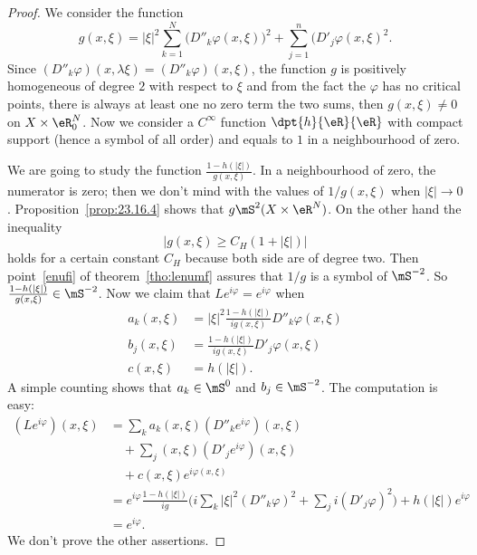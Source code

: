 \begin{proof}
	We consider the function
	\[
		g(x,\xi)=| \xi |^2\sum_{k=1}^N\big( D''_k\varphi(x,\xi) \big)^2+\sum_{j=1}^n\big( D'_j\varphi(x,\xi)^2.
	\]
	Since $(D''_k\varphi)(x,\lambda\xi)=(D''_k\varphi)(x,\xi)$, the function $g$ is positively homogeneous of degree $2$ with respect to $\xi$ and from the fact the $\varphi$ has no critical points, there is always at least one no zero term the two sums, then $g(x,\xi)\neq 0$ on $X\times\eR^N_0$. Now we consider a $C^{\infty}$ function $\dpt{h}{\eR}{\eR}$ with compact support (hence a symbol of all order) and equals to $1$ in a neighbourhood of zero.

	We are going to study the function $\frac{1-h(| \xi |)}{g(x,\xi)}$. In a neighbourhood of zero, the numerator is zero; then we don't mind with the values of $1/g(x,\xi)$ when $| \xi |\to 0$. Proposition~\ref{prop:23.16.4} shows that $g\mS^2(X\times\eR^N)$. On the other hand the inequality
	\[
		| g(x,\xi)\geq C_H(1+| \xi |) |
	\]
	holds for a certain constant $C_H$ because both side are of degree two. Then point~\ref{enufi} of theorem~\ref{tho:lenumf} assures that $1/g$ is a symbol of $ \mS^{-2}$. So $\frac{1-h(| \xi |)}{g(x,\xi)}\in\mS^{-2}$. Now we claim that $Le^{i\varphi}=e^{i\varphi}$ when
	\begin{equation}
		\begin{aligned}
			a_k(x,\xi) & =| \xi |^2\frac{1-h(| \xi |)}{ig(x,\xi)}D''_k\varphi(x,\xi) \\
			b_j(x,\xi) & =\frac{1-h(| \xi |)}{ig(x,\xi)}D'_j\varphi(x,\xi)           \\
			c(x,\xi)   & =h(| \xi |).
		\end{aligned}
	\end{equation}
	A simple counting shows that $a_k\in\mS^0$ and $b_j\in\mS^{-2}$. The computation is easy:
	\begin{equation}
		\begin{split}
			(Le^{i\varphi})(x,\xi)&=\sum_ka_k(x,\xi)(D''_ke^{i\varphi})(x,\xi)\\
			&\quad+\sum_j(x,\xi)(D'_je^{i\varphi})(x,\xi)\\
			&\quad+c(x,\xi)e^{i\varphi(x,\xi)}\\
			&=e^{i\varphi}\frac{1-h(| \xi |)}{ig}\Big( i\sum_k| \xi |^2 (D''_k\varphi)^2+\sum_ji(D'_j\varphi)^2 \Big)+h(| \xi |)e^{i\varphi}\\
			&=e^{i\varphi}.
		\end{split}
	\end{equation}
	We don't prove the other assertions.

\end{proof}

